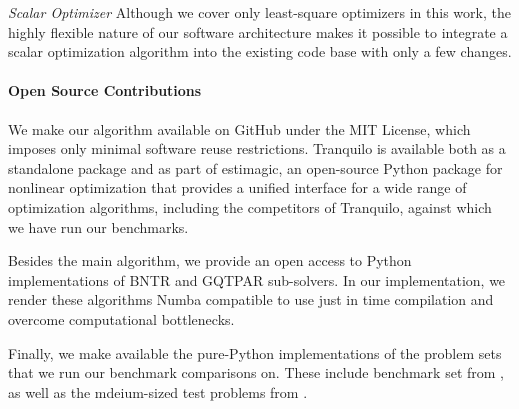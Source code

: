 \textit{Scalar Optimizer} Although we cover only least-square optimizers in this work, the highly flexible nature of our software architecture makes it possible to integrate a scalar optimization algorithm into the existing code base with only a few changes.

\paragraph{Open Source Contributions} We make our algorithm available on GitHub under the MIT License, which imposes only minimal software reuse restrictions. Tranquilo is available both as a standalone package and as part of estimagic, an open-source Python package for nonlinear optimization that provides a unified interface for a wide range of optimization algorithms, including the competitors of Tranquilo, against which we have run our benchmarks.

Besides the main algorithm, we provide an open access to Python implementations of BNTR and GQTPAR sub-solvers. In our implementation, we render these algorithms Numba compatible to use just in time compilation and overcome computational bottlenecks.


Finally, we make available the pure-Python implementations of the problem sets that we run our benchmark comparisons on. These include benchmark set from \citet{Mor2009}, as well as the mdeium-sized test problems from \citet{Cartis2019}.

